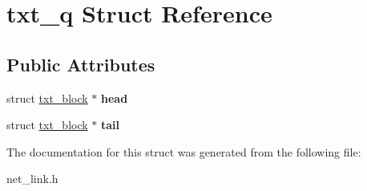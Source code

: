 \hypertarget{structtxt__q}{\section{txt\-\_\-q Struct Reference}
\label{structtxt__q}
}
\subsection*{Public Attributes}
\begin{DoxyCompactItemize}
\item 
\hypertarget{structtxt__q_a17ae4428770db057fc2b34b44163d7ed}{struct \hyperlink{structtxt__block}{txt\-\_\-block} $\ast$ {\bfseries head}}\label{structtxt__q_a17ae4428770db057fc2b34b44163d7ed}

\item 
\hypertarget{structtxt__q_aa2a76036aa81ed1c7b220ade291145ca}{struct \hyperlink{structtxt__block}{txt\-\_\-block} $\ast$ {\bfseries tail}}\label{structtxt__q_aa2a76036aa81ed1c7b220ade291145ca}

\end{DoxyCompactItemize}


The documentation for this struct was generated from the following file\-:\begin{DoxyCompactItemize}
\item 
net\-\_\-link.\-h\end{DoxyCompactItemize}
